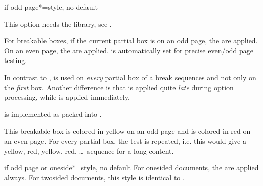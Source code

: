 \clearpage
\begin{docTcbKey}[][doc new=2015-11-13]{if odd page*}{=}{style, no default}
\begin{marker}
This option needs the  library, see .
\end{marker}
For breakable boxes, if the current partial box is on an odd page, the  are applied.
On an even page, the  are applied.
 is automatically set for precise even/odd page testing.

In contrast to ,  is used
on \emph{every} partial box of a break sequences and not only on the
\emph{first} box. Another difference is that 
is applied quite \emph{late} during option processing, while
 is applied immediately.

 is implemented as 
packed into .

\begin{dispExample}
\begin{tcolorbox}[breakable,if odd page*={colback=yellow!50}{colback=red!50}]
  This breakable box is colored in yellow on an odd page
  and is colored in red on an even page. For every partial box, the
  test is repeated, i.e. this would give a yellow, red, yellow, red, \ldots\
  sequence for a long content.
\end{tcolorbox}
\end{dispExample}
\end{docTcbKey}


\begin{docTcbKey}[][doc new=2016-11-18]{if odd page or oneside*}{=}{style, no default}
  For onesided documents, the \meta{odd options} are applied always.
  For twosided documents, this style is identical to .
\end{docTcbKey}


